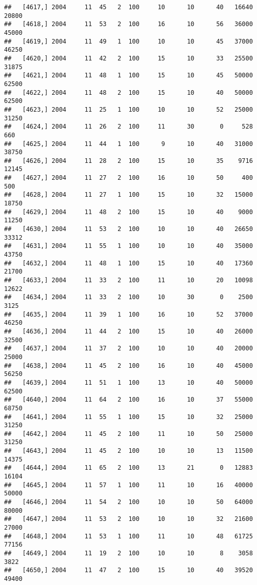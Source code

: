 \documentclass{article}\usepackage[]{graphicx}\usepackage[]{color}
\makeatletter
\newenvironment{kframe}{%
 \def\at@end@of@kframe{}%
 \ifinner\ifhmode%
  \def\at@end@of@kframe{\end{minipage}}%
  \begin{minipage}{\columnwidth}%
 \fi\fi%
 \def\FrameCommand##1{\hskip\@totalleftmargin \hskip-\fboxsep
 \colorbox{shadecolor}{##1}\hskip-\fboxsep
     \hskip-\linewidth \hskip-\@totalleftmargin \hskip\columnwidth}%
 \MakeFramed {\advance\hsize-\width
   \@totalleftmargin\z@ \linewidth\hsize
   \@setminipage}}%
 {\par\unskip\endMakeFramed%
 \at@end@of@kframe}
\newenvironment{knitrout}{}{} %
\makeatother
\begin{document}
\begin{knitrout}
\begin{kframe}
\begin{verbatim}
##   [4617,] 2004     11  45   2  100     10      10      40   16640   20800
##   [4618,] 2004     11  53   2  100     16      10      56   36000   45000
##   [4619,] 2004     11  49   1  100     10      10      45   37000   46250
##   [4620,] 2004     11  42   2  100     15      10      33   25500   31875
##   [4621,] 2004     11  48   1  100     15      10      45   50000   62500
##   [4622,] 2004     11  48   2  100     15      10      40   50000   62500
##   [4623,] 2004     11  25   1  100     10      10      52   25000   31250
##   [4624,] 2004     11  26   2  100     11      30       0     528     660
##   [4625,] 2004     11  44   1  100      9      10      40   31000   38750
##   [4626,] 2004     11  28   2  100     15      10      35    9716   12145
##   [4627,] 2004     11  27   2  100     16      10      50     400     500
##   [4628,] 2004     11  27   1  100     15      10      32   15000   18750
##   [4629,] 2004     11  48   2  100     15      10      40    9000   11250
##   [4630,] 2004     11  53   2  100     10      10      40   26650   33312
##   [4631,] 2004     11  55   1  100     10      10      40   35000   43750
##   [4632,] 2004     11  48   1  100     15      10      40   17360   21700
##   [4633,] 2004     11  33   2  100     11      10      20   10098   12622
##   [4634,] 2004     11  33   2  100     10      30       0    2500    3125
##   [4635,] 2004     11  39   1  100     16      10      52   37000   46250
##   [4636,] 2004     11  44   2  100     15      10      40   26000   32500
##   [4637,] 2004     11  37   2  100     10      10      40   20000   25000
##   [4638,] 2004     11  45   2  100     16      10      40   45000   56250
##   [4639,] 2004     11  51   1  100     13      10      40   50000   62500
##   [4640,] 2004     11  64   2  100     16      10      37   55000   68750
##   [4641,] 2004     11  55   1  100     15      10      32   25000   31250
##   [4642,] 2004     11  45   2  100     11      10      50   25000   31250
##   [4643,] 2004     11  45   2  100     10      10      13   11500   14375
##   [4644,] 2004     11  65   2  100     13      21       0   12883   16104
##   [4645,] 2004     11  57   1  100     11      10      16   40000   50000
##   [4646,] 2004     11  54   2  100     10      10      50   64000   80000
##   [4647,] 2004     11  53   2  100     10      10      32   21600   27000
##   [4648,] 2004     11  53   1  100     11      10      48   61725   77156
##   [4649,] 2004     11  19   2  100     10      10       8    3058    3822
##   [4650,] 2004     11  47   2  100     15      10      40   39520   49400

\end{verbatim}
\end{kframe}
\end{knitrout}
\end{document}
